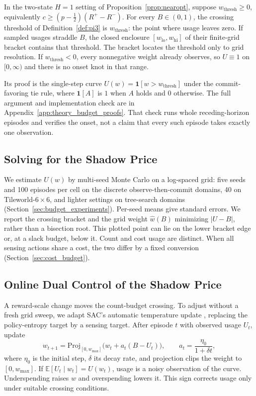 \documentclass[manuscript, screen, review]{jair}
\begin{document}
\begin{corollary}
\label{cor:pi4}
In the two-state $H{=}1$ setting of Proposition~\ref{prop:nearopt}, suppose $w_{\mathrm{thresh}}\geq0$, equivalently $c\geq(p-\tfrac12)(R^+-R^-)$. For every $B\in(0,1)$, the crossing threshold of Definition~\ref{def:pi3} is $w_{\mathrm{thresh}}$: the point where usage leaves zero. If sampled usages straddle $B$, the closed enclosure $[w_{\mathrm{lo}},w_{\mathrm{hi}}]$ of their finite-grid bracket contains that threshold. The bracket locates the threshold only to grid resolution. If $w_{\mathrm{thresh}}<0$, every nonnegative weight already observes, so $U\equiv1$ on $[0,\infty)$ and there is no onset knot in that range.
\end{corollary}

Its proof is the single-step curve $U(w)=\mathbf{1}[w>w_{\mathrm{thresh}}]$ under the commit-favoring tie rule, where $\mathbf{1}[A]$ is $1$ when $A$ holds and $0$ otherwise. The full argument and implementation check are in Appendix~\ref{app:theory_budget_proofs}. That check runs whole receding-horizon episodes and verifies the onset, not a claim that every such episode takes exactly one observation.

\subsection{Solving for the Shadow Price}
\label{sec:budget_solve}

We estimate $U(w)$ by multi-seed Monte Carlo on a log-spaced grid: five seeds and 100 episodes per cell on the discrete observe-then-commit domains, 40 on Tileworld-$6\times6$, and lighter settings on tree-search domains (Section~\ref{sec:budget_experiments}). Per-seed means give standard errors. We report the crossing bracket and the grid weight $\hat w(B)$ minimizing $|U-B|$, rather than a bisection root. This plotted point can lie on the lower bracket edge or, at a slack budget, below it. Count and cost usage are distinct. When all sensing actions share a cost, the two differ by a fixed conversion (Section~\ref{sec:cost_budget}).

\subsection{Online Dual Control of the Shadow Price}
\label{sec:pi5}

A reward-scale change moves the count-budget crossing. To adjust without a fresh grid sweep, we adapt SAC's automatic temperature update \citep{haarnoja2018sac}, replacing the policy-entropy target by a sensing target. After episode $t$ with observed usage $U_t$, update
\begin{equation}
\label{eq:dual_update}
w_{t+1}=\mathrm{Proj}_{[0,w_{\max}]}\big(w_t+a_t(B-U_t)\big),\qquad a_t=\frac{\eta_0}{1+\delta t},
\end{equation}
where $\eta_0$ is the initial step, $\delta$ its decay rate, and projection clips the weight to $[0,w_{\max}]$. If $\mathbb E[U_t\mid w_t]=U(w_t)$, usage is a noisy observation of the curve. Underspending raises $w$ and overspending lowers it. This sign corrects usage only under suitable crossing conditions.
\end{document}
